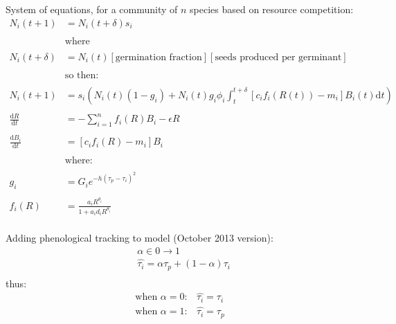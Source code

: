 \documentclass[11pt,a4paper,oneside]{article}
\begin{document}
\newpage
\noindent System of equations, for a community of \(n\) species based
on resource competition:
\begin{align*}
N_{i}(t+1) & = N_{i}(t+\delta)s_{i}
\\
\\
& \text{where}
\\
\\
N_{i}(t+\delta) & = N_{i}(t) [\text{germination fraction}][\text{seeds
  produced per germinant}]
\\
\\
& \text{so then:}
\\
\\
N_{i}(t+1) & =
s_{i}(N_{i}(t)(1-g_{i})+N_{i}(t)g_{i}\phi_{i}\int_t^{t+\delta}[c_{i}f_{i}(R(t))-m_{i}]B_{i}(t)\mathrm{d}t)
\\
\\
\frac{\mathrm{d}R}{\mathrm{d}t} & = - \sum_{i=1}^{n}f_{i}(R)B_{i} -\epsilon R
\\
\\
\frac{\mathrm{d}B_{i}}{\mathrm{d}t} &  = [c_{i}f_{i}(R) - m_{i}]B_{i}
\\
\\
& \text{where:} 
\\
\\
g_{i} & = G_{i}e^{-h(\tau_{p}-\tau_{i})^2}
\\
\\
f_{i}(R) & = \frac{a_{i}R^{\theta_{i}}}{1+a_{i}d_{i}R^{\theta_{i}}}
\\
\end{align*}

\noindent Adding phenological tracking to model (October 2013 version): \\
\begin{align*}
& \alpha \in 0 \rightarrow 1
\\
&\hat{\tau_{i}} = \alpha \tau_{p} + (1-\alpha)\tau_{i}\\
\end{align*}
\noindent thus:
\begin{align*}
\text{when } \alpha = 0: & \hat{\tau_{i}}=\tau_{i}
\\
\text{when }  \alpha = 1: & \hat{\tau_{i}}=\tau_{p}
\end{align*}
\end{document}

